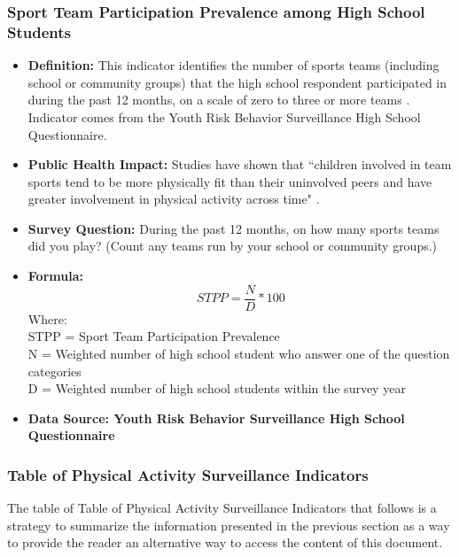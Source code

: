 \documentclass[12pt,letterpaper]{report}
\begin{document}
		\subsubsection{Sport Team Participation Prevalence among High School Students} 
	\begin{itemize}
		\item \textbf{Definition:} This indicator identifies the number of sports teams (including school or community groups) that the high school respondent participated in during the past 12 months, on a scale of zero to three or more teams \cite{YRBS}. Indicator comes from the Youth Risk Behavior Surveillance High School Questionnaire.
		\item \textbf{Public Health Impact:} Studies have shown that ``children involved in team sports tend to be more physically fit than their uninvolved peers and have greater involvement in physical activity across time" \cite{weintraub2008team}.
		\item \textbf{Survey Question:} During the past 12 months, on how many sports teams did you play? (Count any teams run by your school or community groups.)

		\item \textbf{Formula:} 
			\begin{equation}
				STPP = \frac{N}{D} *100
			\end{equation}
Where: \\
			STPP = Sport Team Participation Prevalence\\
			
			N = Weighted number of high school student who answer one of the question categories \\
			
			D = Weighted number of high school students within the survey year \\			

	\item \textbf{Data Source: Youth Risk Behavior Surveillance High School Questionnaire}			
\end{itemize}

	\subsubsection{Table of Physical Activity Surveillance Indicators}
	
	The table of Table of Physical Activity Surveillance Indicators that follows is a strategy to summarize the information presented in the previous section as a way to provide the reader an alternative way to access the content of this document.
	
\end{document}
